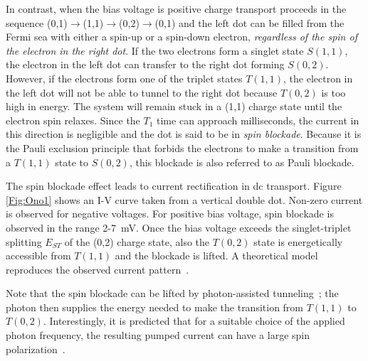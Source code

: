 \documentclass[rmp,twocolumn,aps]{revtex4}
\begin{document}
In contrast, when the bias voltage is positive charge transport
proceeds in the sequence
(0,1)$\rightarrow$(1,1)$\rightarrow$(0,2)$\rightarrow$(0,1) and
the left dot can be filled from the Fermi sea with either a
spin-up or a spin-down electron, \textit{regardless of the spin of
the electron in the right dot}. If the two electrons form a
singlet state $S(1,1)$, the electron in the left dot can transfer
to the right dot forming $S(0,2)$. However, if the electrons form
one of the triplet states $T(1,1)$, the electron in the left dot
will not be able to tunnel to the right dot because $T(0,2)$ is
too high in energy. The system will remain stuck in a (1,1) charge
state until the electron spin relaxes. Since the $T_1$ time can
approach milliseconds, the current in this direction is negligible
and the dot is said to be in \textit{spin blockade}. Because it is
the Pauli exclusion principle that forbids the electrons to make a
transition from a $T(1,1)$ state to $S(0,2)$, this blockade is
also referred to as Pauli blockade.

The spin blockade effect leads to current rectification in dc
transport. Figure \ref{Fig:Ono1} shows an I-V curve taken from a
vertical double dot. Non-zero current is observed for negative
voltages. For positive bias voltage, spin blockade is observed in
the range 2-7~mV. Once the bias voltage exceeds the
singlet-triplet splitting $E_{ST}$ of the (0,2) charge state, also
the $T(0,2)$ state is energetically accessible from $T(1,1)$ and
the blockade is lifted. A theoretical model reproduces the observed current pattern~\cite{FranssonPRB2006}.

Note that the spin blockade can be lifted by photon-assisted tunneling~\cite{SanchezPSS2006}; the photon then supplies the energy needed to make the transition from $T(1,1)$ to $T(0,2)$. Interestingly, it is predicted that for a suitable choice of the applied photon frequency, the resulting pumped current can have a large spin polarization~\cite{CotaPRL2005,SanchezPRB2006}.
\end{document}
